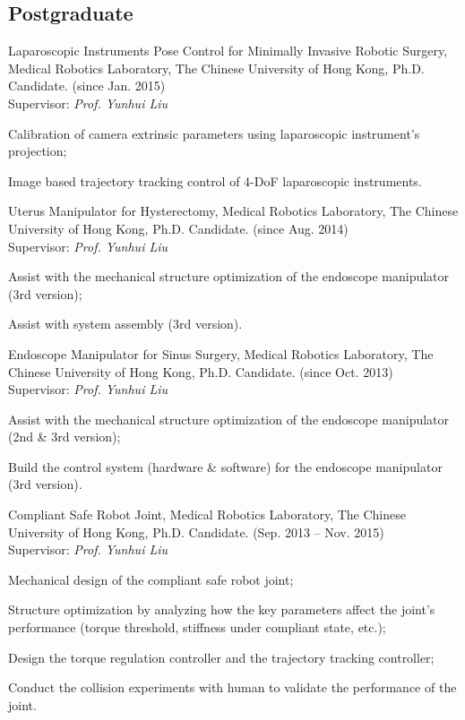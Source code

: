 \documentclass[10pt,letterpaper]{article}
\renewenvironment{itemize}{
  \begin{list}{}{
    \setlength{\leftmargin}{1.5em}
    \setlength{\itemsep}{0.25em}
    \setlength{\parskip}{0pt}
    \setlength{\parsep}{0.25em}
  }
}{
  \end{list}
}
\begin{document}
\subsection*{Postgraduate}
\begin{itemize}
\item Laparoscopic Instruments Pose Control for Minimally Invasive Robotic Surgery, Medical Robotics Laboratory, The Chinese University of Hong Kong, Ph.D. Candidate. (since Jan. 2015) \\
  Supervisor: \textit{Prof. Yunhui Liu}
  \begin{itemize}
  \item Calibration of camera extrinsic parameters using laparoscopic instrument's projection;
  \item Image based trajectory tracking control of 4-DoF laparoscopic instruments.
  \end{itemize}

\item Uterus Manipulator for Hysterectomy, Medical Robotics Laboratory, The Chinese University of Hong Kong, Ph.D. Candidate. (since Aug. 2014) \\
  Supervisor: \textit{Prof. Yunhui Liu}
  \begin{itemize}
  \item Assist with the mechanical structure optimization of the endoscope manipulator (3rd version);
  \item Assist with system assembly (3rd version).
  \end{itemize}

\item Endoscope Manipulator for Sinus Surgery, Medical Robotics Laboratory, The Chinese University of Hong Kong, Ph.D. Candidate. (since Oct. 2013) \\
  Supervisor: \textit{Prof. Yunhui Liu}
  \begin{itemize}
  \item Assist with the mechanical structure optimization of the endoscope manipulator (2nd \& 3rd version);
  \item Build the control system (hardware \& software) for the endoscope manipulator (3rd version).
  \end{itemize}

\item Compliant Safe Robot Joint, Medical Robotics Laboratory, The Chinese University of Hong Kong, Ph.D. Candidate. (Sep. 2013 -- Nov. 2015) \\
  Supervisor: \textit{Prof. Yunhui Liu}
  \begin{itemize}
  \item Mechanical design of the compliant safe robot joint;
  \item Structure optimization by analyzing how the key parameters affect the joint's performance (torque threshold, stiffness under compliant state, etc.);
  \item Design the torque regulation controller and the trajectory tracking controller;
  \item Conduct the collision experiments with human to validate the performance of the joint.
  \end{itemize}
\end{itemize}
\end{document}

